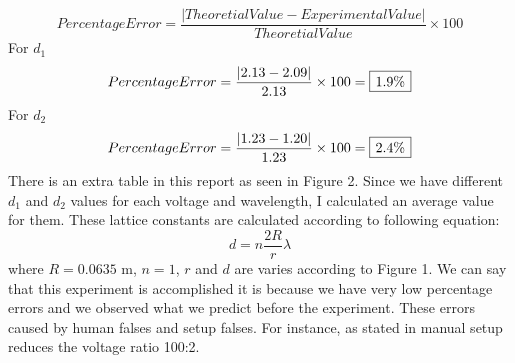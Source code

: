 \documentclass[a4paper,12pt]{article}
\begin{document}
\begin{equation}
Percentage Error=\frac{|Theoretial Value-Experimental Value|}{Theoretial Value}\times 100
\end{equation}
For $d_{1}$
\begin{equation}
Percentage Error=\frac{|2.13-2.09|}{2.13}\times 100 = \framebox[30pt]{1.9\%}
\end{equation}
For $d_{2}$
\begin{equation}
Percentage Error=\frac{|1.23-1.20|}{1.23}\times 100 = \framebox[30pt]{2.4\%}
\end{equation}
There is an extra table in this report as seen in Figure 2. Since we have different $d_{1}$ and $d_{2}$ values for each voltage and wavelength, I calculated an average value for them. These lattice constants are calculated according to following equation:
\begin{equation}
d=n \frac{2R}{r}\lambda
\end{equation}
where $R=0.0635$ m, $n=1$, $r$ and $d$ are varies according to Figure 1. We can say that this experiment is accomplished it is because we have very low percentage errors and we observed what we predict before the experiment. These errors caused by human falses and setup falses. For instance, as stated in manual setup reduces the voltage ratio 100:2.
\end{document}
